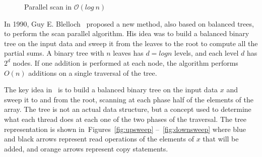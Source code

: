\documentclass[Ingles]{ic-tese-v1}
\newcommand{\rfigs}[2]{Figures~\ref{fig:#1} --~\ref{fig:#2}}
\begin{document}
\begin{figure}[t]
	\centering
	\caption{Parallel scan in $\mathcal{O}(log\  n)$}
	\vfill
\end{figure}

In 1990, Guy  E. Blelloch~\cite{ScanAsPrimitive} proposed a new method,
also based on balanced trees,  to perform the scan parallel algorithm.
His idea  was to build a balanced binary tree on the input data and sweep
it from the leaves to the root to compute all the partial sums. A binary
tree with $n$ leaves has $d = log n$ levels, and each level $d$ has $2^{d}$
nodes. If one addition is performed at each node, the algorithm  performs
$O(n)$ additions on a single traversal of the tree.

The key  idea in~\cite{ScanAsPrimitive} is  to build a  balanced binary
tree on the input data $x$ and  sweep it to and from the root, scanning
at each phase half  of the elements of the array.  The  tree is not an
actual  data structure,  but a  concept  used to  determine what  each
thread does at each one of the  two phases of the traversal.  The tree
representation is  shown in~\rfigs{upsweep}{downsweep} where  blue and
black arrows  represent read  operations of the  elements of  $x$ that
will be added, and orange arrows represent copy statements.
\end{document}
